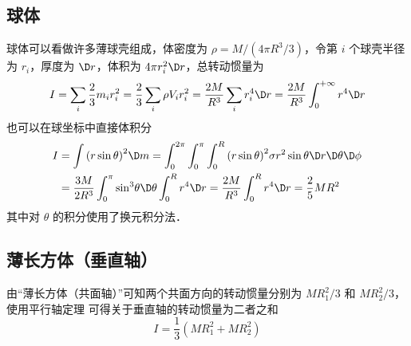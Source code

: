 \subsection{球体}
球体可以看做许多薄球壳组成，体密度为 $\rho  = M/(4\pi {R^3}/3)$，令第 $i$ 个球壳半径为 $r_i$，厚度为 $\D r$，体积为 $4\pi r_i^2\D r$，总转动惯量为
\begin{equation}
I = \sum\limits_i {\frac{2}{3}{m_i}r_i^2}  = \frac{2}{3}\sum\limits_i {\rho {V_i}r_i^2}  = \frac{2M}{R^3}\sum\limits_i {r_i^4\D r}  = \frac{2M}{R^3}\int_0^{ + \infty } {{r^4}\D r}
\end{equation}
也可以在球坐标中直接体积分
\begin{equation}
\begin{aligned}
I &= \int {{{(r\sin \theta )}^2}\D m}  = \int_0^{2\pi } {\int_0^\pi  {\int_0^R {{{(r\sin \theta )}^2}\sigma {r^2}\sin \theta \D r\D\theta \D\phi } } } \\
&= \frac{3M}{2R^3}\int_0^\pi  {{{\sin }^3}\theta \D\theta } \int_0^R {{r^4}\D r}  =\frac{2M}{R^3}\int_0^R {{r^4}\D r}  = \frac{2}{5}M{R^2}
\end{aligned}
\end{equation}
其中对 $\theta$ 的积分使用了换元积分法．%

\subsection{薄长方体（垂直轴）}
由“薄长方体（共面轴）”可知两个共面方向的转动惯量分别为 $MR_1^2/3$ 和 $MR_2^2/3$，使用平行轴定理%
可得关于垂直轴的转动惯量为二者之和
\begin{equation}
I = \frac{1}{3} (MR_1^2+MR_2^2)
\end{equation}